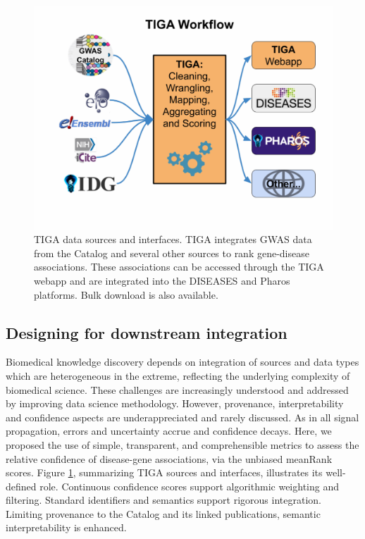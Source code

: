 \begin{figure}
	\includegraphics[width=\textwidth]{figures/tiga/FIG09_TIGA_Workflow.jpg}
	\caption{TIGA data sources and interfaces. TIGA integrates GWAS data from the Catalog and several other sources to rank gene-disease associations. These associations can be accessed through the TIGA webapp and are integrated into the DISEASES\cite{Pletscher-Frankild2015-oo} and Pharos platforms. Bulk download is also available.}
	\label{fig:TIGA_09}
\end{figure}

\subsection{Designing for downstream integration}

Biomedical knowledge discovery depends on integration of sources and data types which are heterogeneous in the extreme, reflecting the underlying complexity of biomedical science. These challenges are increasingly understood and addressed by improving data science methodology. However, provenance, interpretability and confidence aspects are underappreciated and rarely discussed. As in all signal propagation, errors and uncertainty accrue and confidence decays. Here, we proposed the use of simple, transparent, and comprehensible metrics to assess the relative confidence of disease-gene associations, via the unbiased meanRank scores. Figure \ref{fig:TIGA_09}, summarizing TIGA sources and interfaces, illustrates its well-defined role. Continuous confidence scores support algorithmic weighting and filtering. Standard identifiers and semantics support rigorous integration. Limiting provenance to the Catalog and its linked publications, semantic interpretability is enhanced. 

